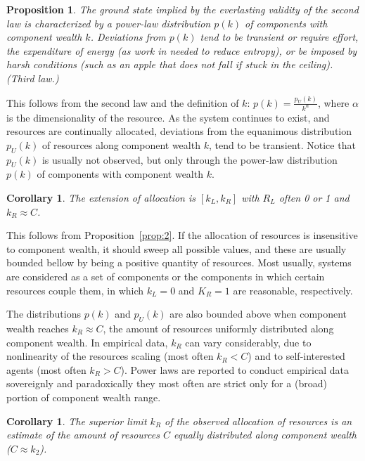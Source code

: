 \documentclass[a4paper, 11pt]{article} %
\newtheorem{proposition}[theorem]{Proposition}
\newtheorem{corollary}[theorem2]{Corollary}
\begin{document}
\begin{proposition}\label{prop:3}
	The ground state implied by the everlasting validity of the second law is characterized by
	a power-law distribution $p(k)$ of components with component wealth $k$. Deviations from $p(k)$ tend to be transient or require effort, the expenditure of energy (as work in needed to reduce entropy), or be imposed by harsh conditions (such as an apple that does not fall if stuck in the ceiling). (Third law.)
\end{proposition}

This follows from the second law and the definition of $k$:
$p(k)=\frac{p_U(k)}{k^\alpha}$, where $\alpha$ is
the dimensionality of the resource.
As the system continues to exist,
and resources are continually allocated, deviations from the equanimous
distribution $p_U(k)$ of resources along component wealth $k$,
 tend to be transient.
 Notice that $p_U(k)$ is usually not observed, but only through 
 the power-law distribution $p(k)$ of components
with component wealth $k$.

\begin{corollary}
	The extension of allocation is $[k_L,k_R]$ with $R_L$ often 0 or 1 and $k_R\approx C$.
\end{corollary}

This follows from Proposition~\ref{prop:2}.
If the allocation of resources is insensitive to component wealth,
it should sweep all possible values, and these are usually
bounded bellow by being a positive quantity of resources.
Most usually, systems are considered as a set of components
or the components in which certain resources couple them,
in which $k_L=0$ and $K_R=1$ are reasonable, respectively.

The distributions $p(k)$ and $p_U(k)$ are also
bounded above when component wealth reaches $k_R \approx C$,
the amount of resources uniformly distributed along component wealth.
In empirical data, $k_R$ can vary considerably, due to
nonlinearity of the resources scaling (most often $k_R<C$) and
to self-interested agents (most often $k_R>C$).
Power laws are reported to conduct empirical data sovereignly and
paradoxically they most often are strict only for a
(broad) portion of component wealth range.


\begin{corollary}
	The superior limit $k_R$ of the observed allocation of resources is an estimate of the amount of resources $C$ equally distributed along component wealth ($C\approx k_2$).
\end{corollary}
\end{document}
